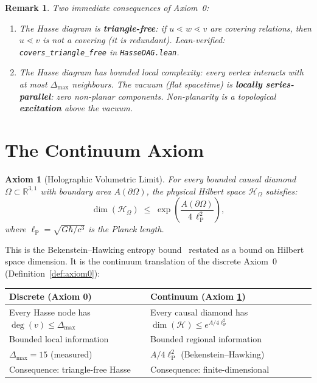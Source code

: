 \documentclass[11pt]{article}
\newtheorem{remark}[theorem]{Remark}
\newtheorem{axiom}{Axiom}
\newcommand{\hilb}{\mathscr{H}}
\newcommand{\lP}{\ell_{\mathrm{P}}}
\begin{document}
\begin{remark}
Two immediate consequences of Axiom~0:
\begin{enumerate}
\item The Hasse diagram is \textbf{triangle-free}: if
  $u \lessdot w \lessdot v$ are covering relations, then
  $u \lessdot v$ is not a covering (it is redundant).
  Lean-verified: \texttt{covers\_triangle\_free} in
  \texttt{HasseDAG.lean}.
\item The Hasse diagram has bounded local complexity:
  every vertex interacts with at most $\Delta_{\max}$
  neighbours.  The vacuum (flat spacetime) is
  \textbf{locally series-parallel}: zero non-planar
  components.  Non-planarity is a topological
  \textbf{excitation} above the vacuum.
\end{enumerate}
\end{remark}

\section{The Continuum Axiom}
\label{sec:axiom}

\begin{axiom}[Holographic Volumetric Limit]
\label{ax:bh}
For every bounded causal diamond
$\Omega \subset \mathbb{R}^{3,1}$ with boundary area
$A(\partial\Omega)$, the physical Hilbert space
$\hilb_\Omega$ satisfies:
\begin{equation}
\label{eq:bh}
  \dim(\hilb_\Omega) \;\le\; \exp\!\left(
    \frac{A(\partial\Omega)}{4\,\lP^2}
  \right),
\end{equation}
where $\lP = \sqrt{G\hbar/c^3}$ is the Planck length.
\end{axiom}

This is the Bekenstein--Hawking entropy
bound~\cite{Bekenstein73, Hawking75} restated as a bound
on Hilbert space dimension.  It is the continuum translation
of the discrete Axiom~0 (Definition~\ref{def:axiom0}):

\medskip
\begin{center}
\renewcommand{\arraystretch}{1.4}
\begin{tabular}{p{5cm}p{5cm}}
\toprule
\textbf{Discrete (Axiom 0)} &
\textbf{Continuum (Axiom \ref{ax:bh})} \\
\midrule
Every Hasse node has $\deg(v) \le \Delta_{\max}$ &
Every causal diamond has
$\dim(\hilb) \le e^{A/4\lP^2}$ \\[4pt]
Bounded local information &
Bounded regional information \\[4pt]
$\Delta_{\max} = 15$ (measured) &
$A/4\lP^2$ (Bekenstein--Hawking) \\[4pt]
Consequence: triangle-free Hasse &
Consequence: finite-dimensional \\
\bottomrule
\end{tabular}
\end{center}
\end{document}
